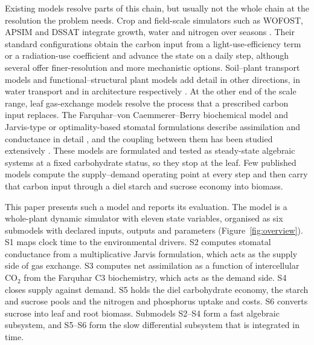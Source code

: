 Existing models resolve parts of this chain, but usually not the whole chain at
the resolution the problem needs. Crop and field-scale simulators such as
WOFOST, APSIM and DSSAT integrate growth, water and nitrogen over seasons
\cite{deWit2019,Holzworth2014,Jones2003}. Their standard configurations obtain
the carbon input from a light-use-efficiency term or a radiation-use
coefficient and advance the state on a daily step, although several offer
finer-resolution and more mechanistic options. Soil--plant transport models and functional--structural plant models add
detail in other directions, in water transport and in architecture
respectively \cite{Janott2011,DeReffye2020,Louarn2020}. At the other end of
the scale range, leaf gas-exchange models resolve the process that a prescribed
carbon input replaces. The Farquhar--von Caemmerer--Berry biochemical model and
Jarvis-type or optimality-based stomatal formulations describe assimilation and
conductance in detail \cite{Farquhar1980,Jarvis1976,Ball1987,Medlyn2011}, and
the coupling between them has been studied extensively
\cite{Damour2010,Buckley2017}. These models are formulated and tested as
steady-state algebraic systems at a fixed carbohydrate status, so they stop at
the leaf. Few published models compute the supply--demand operating point at
every step and then carry that carbon input through a diel starch and sucrose
economy into biomass.

This paper presents such a model and reports its evaluation. The model is a
whole-plant dynamic simulator with eleven state variables, organised as six
submodels with declared inputs, outputs and parameters
(Figure~\ref{fig:overview}). S1 maps clock time to
the environmental drivers. S2 computes stomatal conductance from a
multiplicative Jarvis formulation, which acts as the supply side of gas
exchange. S3 computes net assimilation as a function of intercellular CO$_2$
from the Farquhar C3 biochemistry, which acts as the demand side. S4 closes
supply against demand. S5 holds the diel carbohydrate economy, the starch and
sucrose pools and the nitrogen and phosphorus uptake and costs. S6 converts
sucrose into leaf and root biomass. Submodels S2--S4 form a fast algebraic
subsystem, and S5--S6 form the slow differential subsystem that is integrated
in time.

